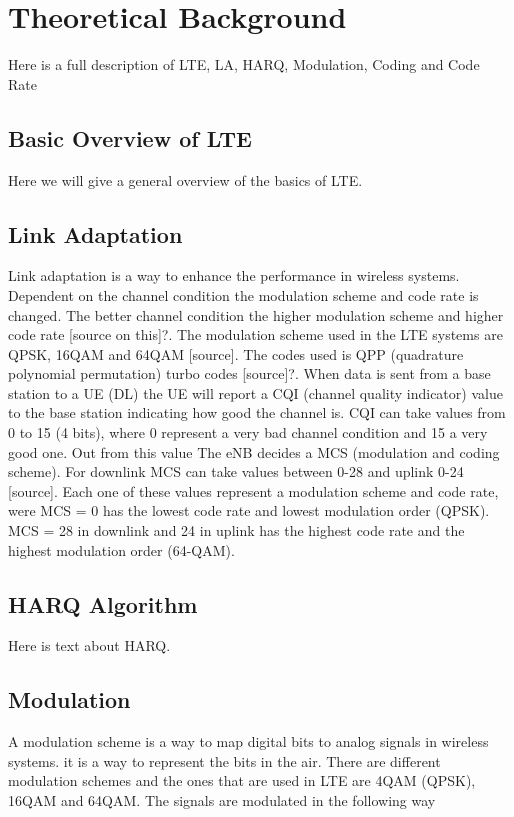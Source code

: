 \documentclass[cropmarks, frame, english]{idamasterthesis}
\begin{document}
\chapter{Theoretical Background}
Here is a full description of LTE, LA, HARQ, Modulation, Coding and Code Rate

\section{Basic Overview of LTE}
Here we will give a general overview of the basics of LTE.

\section{Link Adaptation}
Link adaptation is a way to enhance the performance in wireless systems. Dependent on the channel condition the modulation scheme and code rate is changed. The better channel condition the higher modulation scheme and higher code rate [source on this]?. The modulation scheme used in the LTE systems are QPSK, 16QAM and 64QAM [source]. The codes used is QPP (quadrature polynomial permutation) turbo codes [source]?. When data is sent from a base station to a UE (DL) the UE will report a CQI (channel quality indicator) value to the base station indicating how good the channel is. CQI can take values from 0 to 15 (4 bits), where 0 represent a very bad channel condition and 15 a very good one. Out from this value The eNB decides a MCS (modulation and coding scheme). For downlink MCS can take values between 0-28 and uplink 0-24 [source]. Each one of these values represent a modulation scheme and code rate, were MCS = 0 has the lowest code rate and lowest modulation order (QPSK). MCS = 28 in downlink and 24 in uplink has the highest code rate and the highest modulation order (64-QAM).

\section{HARQ Algorithm}
Here is text about HARQ.

\section{Modulation}
A modulation scheme is a way to map digital bits to analog signals in wireless systems. it is a way to represent the bits in the air.
There are different modulation schemes and the ones that are used in LTE are 4QAM (QPSK), 16QAM and 64QAM. The signals are modulated in the following way 
\end{document}
